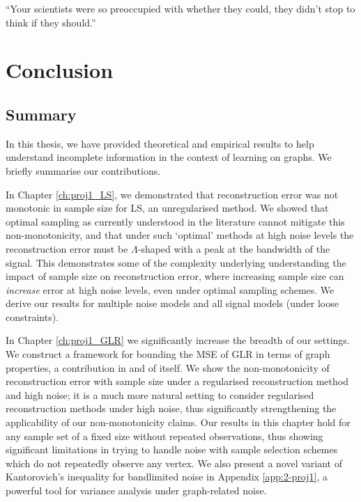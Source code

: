 \begin{savequote}[8cm]
``Your scientists were so preoccupied with whether they could, they didn’t stop to think if they should.''
\end{savequote}


\chapter{\label{ch:conclusion}Conclusion}

\section{Summary}
In this thesis, we have provided theoretical and empirical results to help understand incomplete information in the context of learning on graphs. We briefly summarise our contributions.

In Chapter \ref{ch:proj1_LS}, we demonstrated that reconstruction error was not monotonic in sample size for LS, an unregularised method. We showed that optimal sampling as currently understood in the literature cannot mitigate this non-monotonicity, and that under such `optimal' methods at high noise levels the reconstruction error must be $\Lambda$-shaped with a peak at the bandwidth of the signal.  This demonstrates some of the complexity underlying understanding the impact of sample size on reconstruction error, where increasing sample size can \emph{increase} error at high noise levels, even under optimal sampling schemes. We derive our results for multiple noise models and all signal models (under loose constraints).

In Chapter \ref{ch:proj1_GLR} we significantly increase the breadth of our settings. We construct a framework for bounding the MSE of GLR in terms of graph properties, a contribution in and of itself. We show the non-monotonicity of reconstruction error with sample size under a regularised reconstruction method and high noise; it is a much more natural setting to consider regularised reconstruction methods under high noise, thus significantly strengthening the applicability of our non-monotonicity claims. Our results in this chapter hold for any sample set of a fixed size without repeated observations, thus showing significant limitations in trying to handle noise with sample selection schemes which do not repeatedly observe any vertex. We also present a novel variant of Kantorovich's inequality for bandlimited noise in Appendix \ref{app:2-proj1}, a powerful tool for variance analysis under graph-related noise.

